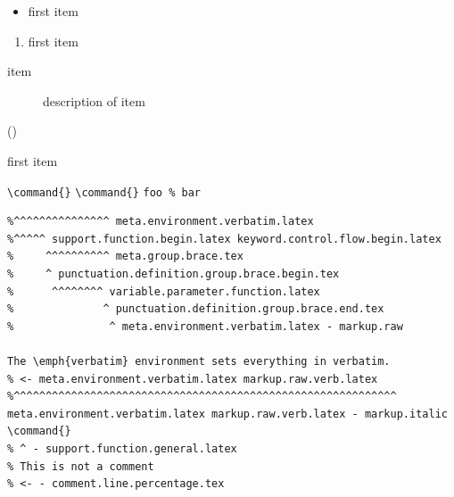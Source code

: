 \documentclass[12pt]{article}
\newcommand\"{quote}
\begin{document}

\begin{itemize}
\item first item
\end{itemize}

\begin{enumerate}
\item first item
\end{enumerate}

\begin{description}
\item[item] description of item
\end{description}

\begin{list}{()}{}
\item first item
\end{list}


\command{}
\verb|\command{}|
\verb+\command{}+
\verb|foo % bar|


\begin{verbatim}
%^^^^^^^^^^^^^^^ meta.environment.verbatim.latex
%^^^^^ support.function.begin.latex keyword.control.flow.begin.latex
%     ^^^^^^^^^^ meta.group.brace.tex
%     ^ punctuation.definition.group.brace.begin.tex
%      ^^^^^^^^ variable.parameter.function.latex
%              ^ punctuation.definition.group.brace.end.tex
%               ^ meta.environment.verbatim.latex - markup.raw

The \emph{verbatim} environment sets everything in verbatim.
% <- meta.environment.verbatim.latex markup.raw.verb.latex
%^^^^^^^^^^^^^^^^^^^^^^^^^^^^^^^^^^^^^^^^^^^^^^^^^^^^^^^^^^^^ meta.environment.verbatim.latex markup.raw.verb.latex - markup.italic
\command{}
% ^ - support.function.general.latex
% This is not a comment
% <- - comment.line.percentage.tex
  \end{verbatim}
\end{document}
